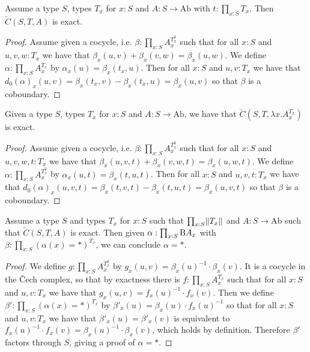 \begin{lemma}\label{section-exact-cech-complex}
Assume a type $S$, types $T_x$ for $x:S$ and $A:S\to\mathrm{Ab}$ with $t:\prod_{x:S}T_x$. Then $\check{C}(S,T,A)$ is exact.
\end{lemma}

\begin{proof}
Assume given a cocycle, i.e. $\beta:\prod_{x:S}A_x^{T_x^2}$ such that for all $x:S$ and $u,v,w:T_x$ we have that $\beta_x(u,v)+\beta_x(v,w) = \beta_x(u,w)$. We define $\alpha:\prod_{x:S}A_x^{T_x}$ by $\alpha_x(u) = \beta_x(t_x,u)$. Then for all $x:S$ and $u,v:T_x$ we have that $d_0(\alpha)_x(u,v) =  \beta_x(t_x,v) - \beta_x(t_x,u) = \beta_x(u,v)$ so that $\beta$ is a coboundary.
\end{proof}

\begin{lemma}\label{canonical-exact-cech-complex}
Given a type $S$, types $T_x$ for $x:S$ and $A:S\to\mathrm{Ab}$, we have that $\check{C}(S,T,\lambda x.A_x^{T_x})$ is exact.
\end{lemma}

\begin{proof}
Assume given a cocycle, i.e. $\beta:\prod_{x:S}A_x^{T_x^3}$ such that for all $x:S$ and $u,v,w,t:T_x$ we have that $\beta_x(u,v,t)+\beta_x(v,w,t) = \beta_x(u,w,t)$. We define $\alpha:\prod_{x:S}A_x^{T_x^2}$ by $\alpha_x(u,t) = \beta_x(t,u,t)$. Then for all $x:S$ and $u,v,t:T_x$ we have that $d_0(\alpha)_x(u,v,t) = \beta_x(t,v,t) - \beta_x(t,u,t) = \beta_x(u,v,t)$ so that $\beta$ is a coboundary.
\end{proof}

\begin{lemma}\label{exact-cech-complex-vanishing-cohomology}
Assume a type $S$ and types $T_x$ for $x:S$ such that $\prod_{x:S}\lVert T_x \rVert$ and $A:S\to\mathrm{Ab}$ such that $\check{C}(S,T,A)$ is exact.
Then given $\alpha:\prod_{x:S}\mathrm{B} A_x$ with $\beta:\prod_{x:S} (\alpha(x) = *)^{T_x}$, we can conclude $\alpha = *$.
\end{lemma}

\begin{proof}
We define $g : \prod_{x:S} A_x^{T_x^2}$ by $g_x(u,v) = \beta_x(u)^{-1}\cdot\beta_x(v)$.
It is a cocycle in the \v{C}ech complex, so that by exactness there is $f:\prod_{x:S}A_x^{T_x}$ such that for all $x:S$ and $u,v:T_x$ we have that $g_x(u,v)=f_x(u)^{-1}\cdot f_x(v)$.
Then we define $\beta' : \prod_{x:S}(\alpha(x)=*)^{T_x}$ by $\beta'_x(u) = \beta_x(u)\cdot f_x(u)^{-1}$
so that for all $x:S$ and $u,v:T_x$ we have that $\beta'_x(u) = \beta'_x(v)$ is equivalent to $f_x(u)^{-1}\cdot f_x(v) = \beta_x(u)^{-1}\cdot\beta_x(v)$, which holds by definition. Therefore $\beta'$ factors through $S$, giving a proof of $\alpha = *$.
\end{proof}



